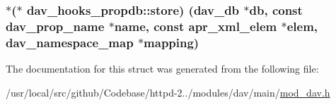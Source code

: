 \subsubsection[{\texorpdfstring{store}{store}}]{$\ast$($\ast$ dav\+\_\+hooks\+\_\+propdb\+::store) ({\bf dav\+\_\+db} $\ast$db, const {\bf dav\+\_\+prop\+\_\+name} $\ast${\bf name}, const {\bf apr\+\_\+xml\+\_\+elem} $\ast${\bf elem}, {\bf dav\+\_\+namespace\+\_\+map} $\ast$mapping)}\hypertarget{structdav__hooks__propdb_a40fcca407427c7cd28077444faea78b9}{}\label{structdav__hooks__propdb_a40fcca407427c7cd28077444faea78b9}


The documentation for this struct was generated from the following file\+:\begin{DoxyCompactItemize}
\item 
/usr/local/src/github/\+Codebase/httpd-\/2../modules/dav/main/\hyperlink{mod__dav_8h}{mod\+\_\+dav.\+h}\end{DoxyCompactItemize}

